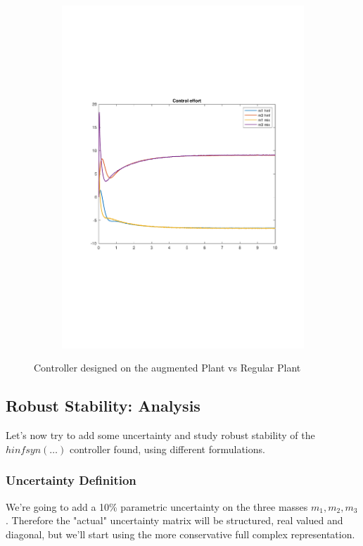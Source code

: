 \documentclass[a4paper, 12pt]{article}
\begin{document}
\begin{figure}[h!]{}
\begin{subfigure}[t]{0.45\textwidth}
    \includegraphics[width=\textwidth]{Figures/fig09b.pdf}
           \label{fig:fig09b}
    \end{subfigure}
    \caption{Controller designed on the augmented Plant vs Regular Plant}
    \label{fig:fig09}
   \end{figure}
\subsection{Robust Stability: Analysis}
Let's now try to add some uncertainty and study robust stability of the $hinfsyn(\dots)$ controller found, using different formulations.
\subsubsection{Uncertainty Definition}
We're going to add a 10\% parametric uncertainty on the three masses $m_1,m_2,m_3$. Therefore the "actual" uncertainty matrix will be structured, real valued and diagonal, but we'll start using the more conservative full complex representation.
\end{document}

